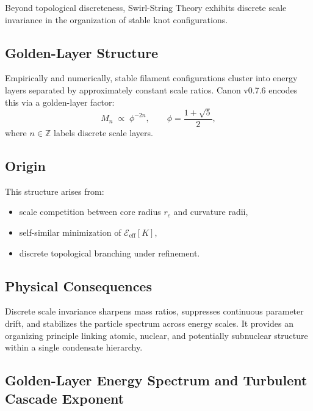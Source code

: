 \documentclass[10pt]{article}
\begin{document}
Beyond topological discreteness, Swirl-String Theory exhibits discrete
scale invariance in the organization of stable knot configurations.

\subsection{Golden-Layer Structure}

Empirically and numerically, stable filament configurations cluster into
energy layers separated by approximately constant scale ratios.
Canon v0.7.6 encodes this via a golden-layer factor:
\begin{equation}
    M_n \;\propto\; \phi^{-2n}, \qquad \phi=\frac{1+\sqrt{5}}{2},
\end{equation}
where $n\in\mathbb{Z}$ labels discrete scale layers.

\subsection{Origin}

This structure arises from:
\begin{itemize}
    \item scale competition between core radius $r_c$ and curvature radii,
    \item self-similar minimization of $\mathcal{E}_{\mathrm{eff}}[K]$,
    \item discrete topological branching under refinement.
\end{itemize}

\subsection{Physical Consequences}

Discrete scale invariance sharpens mass ratios, suppresses continuous
parameter drift, and stabilizes the particle spectrum across energy scales.
It provides an organizing principle linking atomic, nuclear, and potentially
subnuclear structure within a single condensate hierarchy.

    

\subsection{Golden-Layer Energy Spectrum and Turbulent Cascade Exponent}
\label{sec:golden_spectrum}
\end{document}
